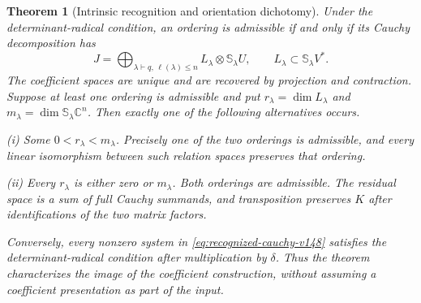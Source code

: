 \documentclass[11pt,reqno]{amsart}
\numberwithin{equation}{section}
\newtheorem{theorem}{Theorem}[section]
\theoremstyle{definition}\newtheorem{definition}[theorem]{Definition}
\theoremstyle{remark}\newtheorem{remark}[theorem]{Remark}
\newcommand{\C}{\mathbb C}\newcommand{\Q}{\mathbb Q}
\begin{document}
\begin{theorem}[Intrinsic recognition and orientation dichotomy]
\label{thm:recognition-dichotomy-v148}
Under the determinant-radical condition, an ordering is admissible
if and only if its Cauchy decomposition has
\begin{equation}\label{eq:recognized-cauchy-v148}
 J=\bigoplus_{\lambda\vdash q,\,\ell(\lambda)\le n}
         L_\lambda\otimes\mathbb S_\lambda U,
 \qquad L_\lambda\subset\mathbb S_\lambda V^*.
\end{equation}
The coefficient spaces are unique and are recovered by projection
and contraction.  Suppose at least one ordering is admissible and
put \(r_\lambda=\dim L_\lambda\) and
\(m_\lambda=\dim\mathbb S_\lambda\C^n\).  Then exactly one
of the following alternatives occurs.

\smallskip
\noindent (i) Some \(0<r_\lambda<m_\lambda\).  Precisely one
of the two orderings is admissible, and every linear isomorphism
between such relation spaces preserves that ordering.

\smallskip
\noindent (ii) Every \(r_\lambda\) is either zero or
\(m_\lambda\).  Both orderings are admissible.  The residual
space is a sum of full Cauchy summands, and transposition preserves
\(K\) after identifications of the two matrix factors.

\smallskip
Conversely, every nonzero system in
\eqref{eq:recognized-cauchy-v148} satisfies the determinant-radical
condition after multiplication by \(\delta\).  Thus the theorem
characterizes the image of the coefficient construction, without
assuming a coefficient presentation as part of the input.
\end{theorem}
\end{document}
